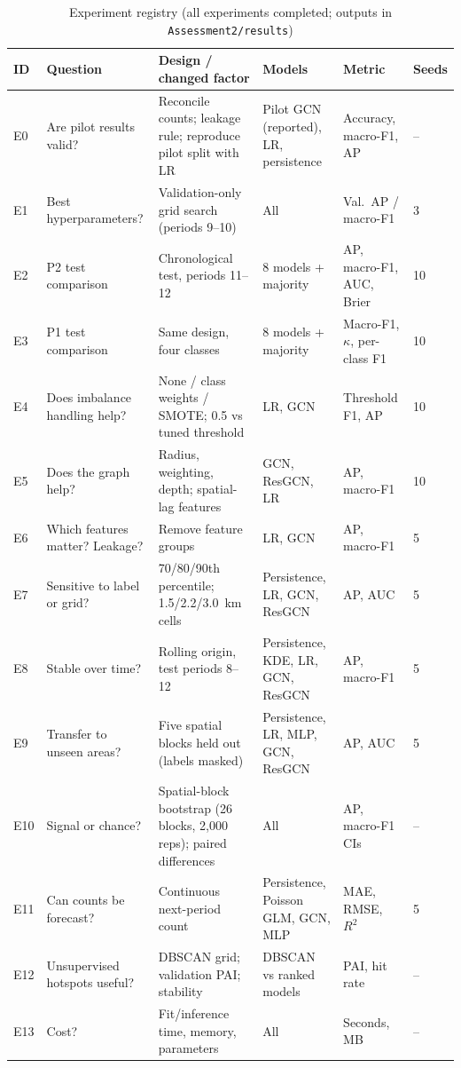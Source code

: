 \documentclass[11pt,a4paper]{report}
\begin{document}
\begin{table}[H]
\centering\scriptsize
\caption{Experiment registry (all experiments completed; outputs in \texttt{Assessment2/results})}
\label{tab:registry}
\begin{tabularx}{\textwidth}{@{}l L{3.4cm} Y L{2.3cm} L{1.6cm} l@{}}
\toprule
ID & Question & Design / changed factor & Models & Metric & Seeds\\
\midrule
E0 & Are pilot results valid? & Reconcile counts; leakage rule; reproduce pilot split with LR & Pilot GCN (reported), LR, persistence & Accuracy, macro-F1, AP & --\\
E1 & Best hyperparameters? & Validation-only grid search (periods 9--10) & All & Val.\ AP / macro-F1 & 3\\
E2 & P2 test comparison & Chronological test, periods 11--12 & 8 models + majority & AP, macro-F1, AUC, Brier & 10\\
E3 & P1 test comparison & Same design, four classes & 8 models + majority & Macro-F1, $\kappa$, per-class F1 & 10\\
E4 & Does imbalance handling help? & None / class weights / SMOTE; 0.5 vs tuned threshold & LR, GCN & Threshold F1, AP & 10\\
E5 & Does the graph help? & Radius, weighting, depth; spatial-lag features & GCN, ResGCN, LR & AP, macro-F1 & 10\\
E6 & Which features matter? Leakage? & Remove feature groups & LR, GCN & AP, macro-F1 & 5\\
E7 & Sensitive to label or grid? & 70/80/90th percentile; 1.5/2.2/3.0~km cells & Persistence, LR, GCN, ResGCN & AP, AUC & 5\\
E8 & Stable over time? & Rolling origin, test periods 8--12 & Persistence, KDE, LR, GCN, ResGCN & AP, macro-F1 & 5\\
E9 & Transfer to unseen areas? & Five spatial blocks held out (labels masked) & Persistence, LR, MLP, GCN, ResGCN & AP, AUC & 5\\
E10 & Signal or chance? & Spatial-block bootstrap (26 blocks, 2,000 reps); paired differences & All & AP, macro-F1 CIs & --\\
E11 & Can counts be forecast? & Continuous next-period count & Persistence, Poisson GLM, GCN, MLP & MAE, RMSE, $R^2$ & 5\\
E12 & Unsupervised hotspots useful? & DBSCAN grid; validation PAI; stability & DBSCAN vs ranked models & PAI, hit rate & --\\
E13 & Cost? & Fit/inference time, memory, parameters & All & Seconds, MB & --\\

\end{tabularx}
\end{table}
\end{document}
